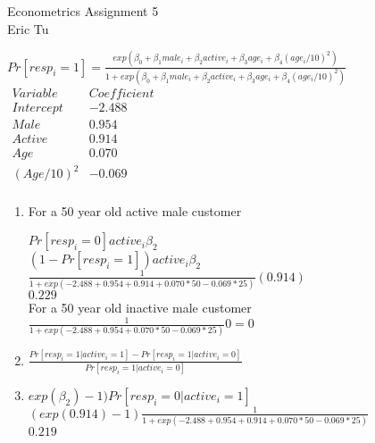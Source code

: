 \documentclass{article}
\begin{document}
\begin{center}
Econometrics Assignment 5 \\
Eric Tu
\end{center}

	$Pr[resp_{i} = 1] = \frac{exp(\beta_{0} + \beta_{1} male_{i} + \beta_{2} active_{i} + \beta_{3} age_{i} + \beta_{4}(age_{i}/10)^{2})}{1+exp(\beta_{0} + \beta_{1} male_{i} + \beta_{2} active_{i} + \beta_{3} age_{i} + \beta_{4}(age_{i}/10)^{2})}$ \\[8pt]

	$\begin{matrix}
	Variable & Coefficient \\
	Intercept & -2.488 \\
	Male & 0.954 \\
	Active & 0.914 \\
	Age & 0.070 \\
	(Age/10)^{2} & -0.069 \\
	\end{matrix}$

\begin{enumerate}[label=(\alph*)]



	\item{}
	For a 50 year old active male customer
	
	$Pr[resp_{i} = 0]active_{i} \beta_{2}$ \\ [4pt]
	$ (1 - Pr[resp_{i} =1])active_{i} \beta_{2}$ \\ [4pt]
	$ \frac{1}{1+exp(-2.488 + 0.954 + 0.914 + 0.070 * 50 -0.069 * 25)} (0.914) $ \\[4pt]
	$ 0.229 $ \\ [8pt]
	
	For a 50 year old inactive male customer \\
	$\frac{1}{1+exp(-2.488 + 0.954 + 0.070 * 50 -0.069 * 25)} 0 = 0$
	
	\item
	$\frac{Pr[resp_{i}=1|active_{i}=1] - Pr[resp_{i}=1|active_{i}=0]}{Pr[resp_{i}=1|active_{i}=0]}	$
	
	\item
	$exp(\beta_{2}) - 1) Pr[ resp_{i} =0 | active_{i} =1]$ \\[4pt]
	$(exp(0.914) -1) \frac{1}{1+exp(-2.488 + 0.954 + 0.914 + 0.070 * 50 -0.069 * 25)}$ \\[4pt]
	$ 0.219$ \\ [8pt]
\end{enumerate}
\end{document}
